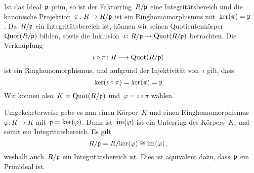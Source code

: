 \documentclass{scrartcl}
\begin{document}
\begin{solution}
  Ist das Ideal~$\mathfrak{p}$ prim, so ist der Faktorring~$R/\mathfrak{p}$ eine Integritätsbereich und die kanonische Projektion~$\pi \colon R \to R/\pideal$ ist ein Ringhomomorphismus mit~$\ker(\pi) = \mathfrak{p}$.
  Da~$R/\mathfrak{p}$ ein Integritätsbereich ist, können wir seinen Quotientenkörper~$\operatorname{Quot}(R/\mathfrak{p})$ bilden, sowie die Inklusion~$\iota \colon R/\pideal \to \Quot(R/\pideal)$ betrachten.
  Die Verknüpfung
  \[
    \iota \circ \pi
    \colon
    R
    \to
    \Quot(R/\pideal)
  \]
  ist ein Ringhomomorphismus, und aufgrund der Injektivität von~$\iota$ gilt, dass
  \[
    \ker(\iota \circ \pi)
    =
    \ker(\pi)
    =
    \mathfrak{p}
  \]
  Wir können also~$K = \operatorname{Quot}(R/\mathfrak{p})$ und~$\varphi = \iota \circ \pi$ wählen.

  Umgekehrterweise gebe es nun einen Körper~$K$ und einen Ringhomomorphismus~$\varphi \colon R \to K$ mit~$\mathfrak{p} = \ker(\varphi)$.
  Dann ist~$\operatorname{im}(\varphi)$ ist ein Unterring des Körpers~$K$, und somit ein Integritätsbereich.
  Es gilt
  \[
    R / \mathfrak{p}
    =
    R / {\ker(\varphi)}
    \cong
    \operatorname{im}(\varphi) \,,
  \]
  weshalb auch~$R/\mathfrak{p}$ ein Integritätsbereich ist.
  Dies ist äquivalent dazu, dass~$\mathfrak{p}$ ein Primideal ist.
\end{solution}




\clearpage




\printsolutions
\end{document}
